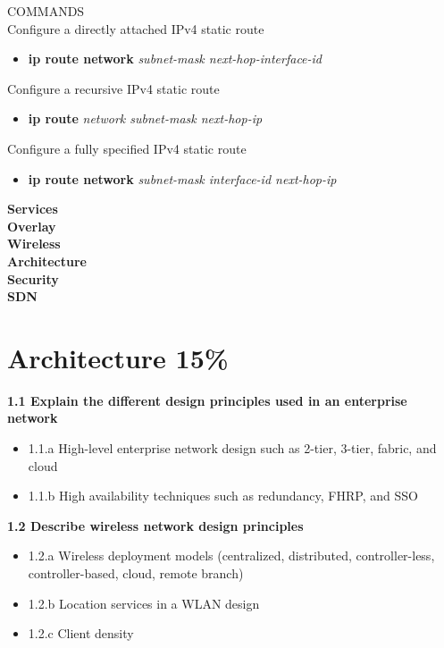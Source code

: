 \documentclass{article}
\begin{document}
COMMANDS\\
	Configure a directly attached IPv4 static route
		\begin{itemize}
			\item \textbf{ip route network} \textit{subnet-mask next-hop-interface-id} 
		\end{itemize}
	Configure a recursive IPv4 static route
		\begin{itemize}
			\item \textbf{ip route} \textit{network subnet-mask next-hop-ip} 
		\end{itemize}
	Configure a fully specified IPv4 static route
		\begin{itemize}
			\item \textbf{ip route network} \textit{subnet-mask interface-id next-hop-ip}
		\end{itemize}

\newpage
\noindent\textbf{Services}\\

\newpage
\noindent\textbf{Overlay}\\

\newpage
\noindent\textbf{Wireless}\\

\newpage
\noindent\textbf{Architecture}\\

\newpage
\noindent\textbf{Security}\\

\newpage
\noindent\textbf{SDN}\\

\newpage
\section{Architecture 15\%}
\textbf{1.1 Explain the different design principles used in an enterprise network}
\begin{itemize}
\item 1.1.a High-level enterprise network design such as 2-tier, 3-tier, fabric, and cloud
\item 1.1.b High availability techniques such as redundancy, FHRP, and SSO
\end{itemize}

\noindent\textbf{1.2 Describe wireless network design principles}
\begin{itemize}
\item 1.2.a Wireless deployment models (centralized, distributed, controller-less, controller-based, cloud, remote branch)
\item 1.2.b Location services in a WLAN design
\item 1.2.c Client density
\end{itemize}
\end{document}
